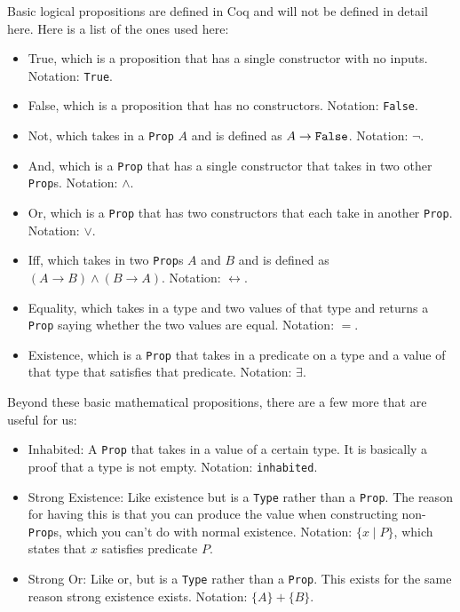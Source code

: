 \documentclass[../../math.tex]{subfiles}
\begin{document}
Basic logical propositions are defined in Coq and will not be defined in detail
here.  Here is a list of the ones used here:
\begin{itemize}
    \item True, which is a proposition that has a single constructor with no
    inputs.  Notation: \verb|True|.
    \item False, which is a proposition that has no constructors.  Notation:
    \verb|False|.
    \item Not, which takes in a \verb|Prop| $A$ and is defined as $A \rightarrow
    \verb|False|$.  Notation: $\neg$.
    \item And, which is a \verb|Prop| that has a single constructor that takes
    in two other \verb|Prop|s.  Notation: $\wedge$.
    \item Or, which is a \verb|Prop| that has two constructors that each take
    in another \verb|Prop|.  Notation: $\vee$.
    \item Iff, which takes in two \verb|Prop|s $A$ and $B$ and is defined as $(A
    \rightarrow B) \wedge (B \rightarrow A)$.  Notation: $\leftrightarrow$.
    \item Equality, which takes in a type and two values of that type and
    returns a \verb|Prop| saying whether the two values are equal.  Notation:
    $=$.
    \item Existence, which is a \verb|Prop| that takes in a predicate on a type
    and a value of that type that satisfies that predicate.  Notation:
    $\exists$.
\end{itemize}

Beyond these basic mathematical propositions, there are a few more that are
useful for us:

\begin{itemize}
    \item Inhabited: A \verb|Prop| that takes in a value of a certain type.  It
    is basically a proof that a type is not empty.  Notation: \verb|inhabited|.
    \item Strong Existence: Like existence but is a \verb|Type| rather than a
    \verb|Prop|.  The reason for having this is that you can produce the value
    when constructing non-\verb|Prop|s, which you can't do with normal
    existence.  Notation: $\{x \mid P\}$, which states that $x$ satisfies
    predicate $P$.
    \item Strong Or: Like or, but is a \verb|Type| rather than a \verb|Prop|.
    This exists for the same reason strong existence exists.  Notation: $\{A\} +
    \{B\}$.
\end{itemize}
\end{document}
